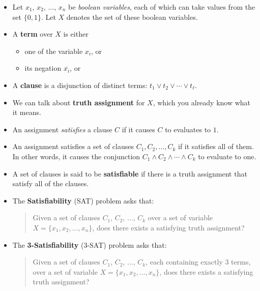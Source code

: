 \documentclass[10pt]{article}
\begin{document}
  \begin{itemize}
    \item Let $x_1$, $x_2$, $\dotsc$, $x_n$ be \emph{boolean variables}, each of
      which can take values from the set $\{0,1\}$. Let $X$ denotes
      the set of these boolean variables.
      
    \item A \textbf{term} over $X$ is either
      \begin{itemize}
        \item one of the variable $x_i$, or
        \item its negation $\overline{x_i}$, or
      \end{itemize}

    \item A \textbf{clause} is a disjunction of distinct terms: $t_1 \vee t_2 \vee \dotsb \vee t_\ell.$
    
    \item We can talk about \textbf{truth assignment} for $X$, which you already know what it means.
     
    \item An assignment \emph{satisfies} a clause $C$ if it causes $C$ to evaluates to $1$.
    
    \item An assignment satisfies a set of clauses $C_1, C_2, \dotsc, C_k$ if it satisfies all of them.
      In other words, it causes the conjunction $C_1 \wedge C_2 \wedge \dotsb \wedge C_k$ to
      evaluate to one.
      
    \item A set of clauses is said to be \textbf{satisfiable} if there is a truth assignment
      that satisfy all of the clauses.
    
    \item The \textbf{Satisfiability} (SAT) problem asks that:
      \begin{quote}
        Given a set of clauses $C_1$, $C_2$, $\dotsc$, $C_k$ over a set of variable $X = \{ x_1, x_2, \dotsc, x_n\}$,
        does there exists a satisfying truth assignment?
      \end{quote}
      
    \item The \textbf{3-Satisfiability} (3-SAT) problem asks that:
      \begin{quote}
        Given a set of clauses $C_1$, $C_2$, $\dotsc$, $C_k$, each containing exactly $3$ terms,
        over a set of variable $X = \{ x_1, x_2, \dotsc, x_n\}$,
        does there exists a satisfying truth assignment?
      \end{quote}
      

\end{itemize}
\end{document}
